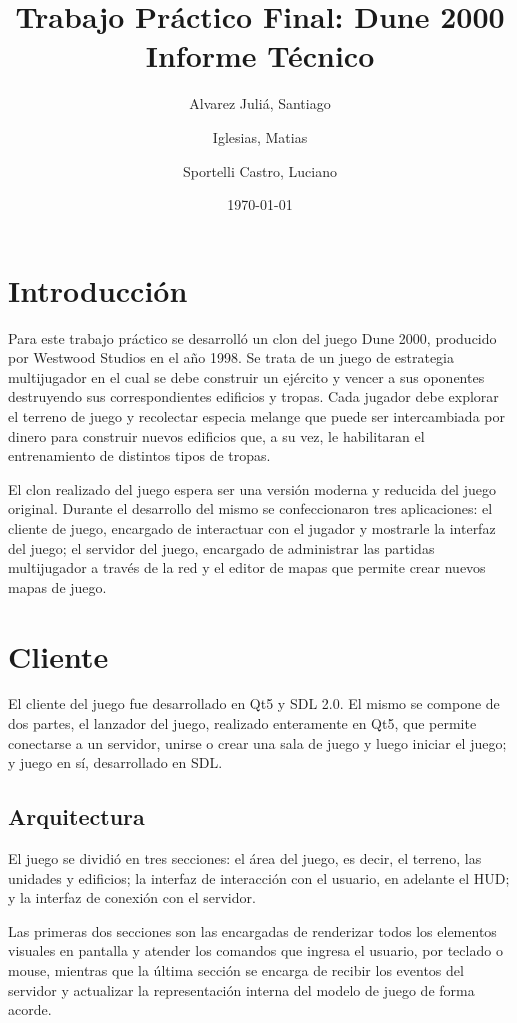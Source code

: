 \documentclass[titlepage,a4paper,12pt]{article}
\title{ Trabajo Práctico Final: Dune 2000 \\ 
 \large{Informe Técnico}}
\author{Alvarez Juliá, Santiago \and Iglesias, Matias \and Sportelli Castro, Luciano}
\date{ \today }
\begin{document}
\maketitle

\tableofcontents %

\newpage
\section{Introducción}
Para este trabajo práctico se desarrolló un clon del juego Dune 2000, producido por Westwood Studios en el año 1998. Se trata de un juego de estrategia multijugador en el cual se debe construir un ejército y vencer a sus oponentes destruyendo sus correspondientes edificios y tropas.
Cada jugador debe explorar el terreno de juego y recolectar especia melange que puede ser intercambiada por dinero para construir nuevos edificios que, a su vez, le habilitaran el entrenamiento de distintos tipos de tropas.

El clon realizado del juego espera ser una versión moderna y reducida del juego original. Durante el desarrollo del mismo se confeccionaron tres aplicaciones: el cliente de juego, encargado de interactuar con el jugador y mostrarle la interfaz del juego; el servidor del juego, encargado de administrar las partidas multijugador a través de la red y el editor de mapas que permite crear nuevos mapas de juego.

\section{Cliente}
El cliente del juego fue desarrollado en Qt5 y SDL 2.0. El mismo se compone de dos partes, el lanzador del juego, realizado enteramente en Qt5, que permite conectarse a un servidor, unirse o crear una sala de juego y luego iniciar el juego; y juego en sí, desarrollado en SDL.

\subsection{Arquitectura}
El juego se dividió en tres secciones: el área del juego, es decir, el terreno, las unidades y edificios; la interfaz de interacción con el usuario, en adelante el HUD; y la interfaz de conexión con el servidor.

Las primeras dos secciones son las encargadas de renderizar todos los elementos visuales en pantalla y atender los comandos que ingresa el usuario, por teclado o mouse, mientras que la última sección se encarga de recibir los eventos del servidor y actualizar la representación interna del modelo de juego de forma acorde.
\end{document}
